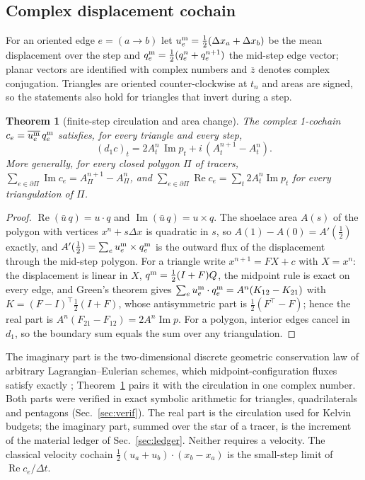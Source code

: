 \documentclass[11pt]{article}
\newtheorem{theorem}{Theorem}\newtheorem{proposition}{Proposition}\newtheorem{corollary}{Corollary}
\theoremstyle{definition}\newtheorem{definition}{Definition}\theoremstyle{remark}\newtheorem{remark}{Remark}
\newcommand{\im}{\operatorname{Im}}\newcommand{\re}{\operatorname{Re}}
\begin{document}
\subsection{Complex displacement cochain}
For an oriented edge $e=(a\to b)$ let $u^{\rm m}_e=\frac12(\Delta x_a+\Delta x_b)$ be the mean displacement over the step and $q^{\rm m}_e=\frac12(q_e^n+q_e^{n+1})$ the mid-step edge vector; planar vectors are identified with complex numbers and $\overline{z}$ denotes complex conjugation. Triangles are oriented counter-clockwise at $t_n$ and areas are signed, so the statements also hold for triangles that invert during a step.
\begin{theorem}[finite-step circulation and area change]\label{thm:cplx}
The complex 1-cochain $c_e=\overline{u^{\rm m}_e}\,q^{\rm m}_e$ satisfies, for every triangle and every step,
\begin{equation}
(d_1c)_t=2A_t^n\,\im p_t+i\,(A_t^{n+1}-A_t^n).
\end{equation}
More generally, for every closed polygon $\Pi$ of tracers, $\sum_{e\in\partial\Pi}\im c_e=A_\Pi^{n+1}-A_\Pi^n$, and $\sum_{e\in\partial\Pi}\re c_e=\sum_t2A_t^n\im p_t$ for every triangulation of $\Pi$.
\end{theorem}
\begin{proof}
$\re(\bar u\,q)=u\cdot q$ and $\im(\bar u\,q)=u\times q$. The shoelace area $A(s)$ of the polygon with vertices $x^n+s\Delta x$ is quadratic in $s$, so $A(1)-A(0)=A'(\frac12)$ exactly, and $A'(\frac12)=\sum_eu^{\rm m}_e\times q^{\rm m}_e$ is the outward flux of the displacement through the mid-step polygon. For a triangle write $x^{n+1}=FX+c$ with $X=x^n$: the displacement is linear in $X$, $q^{\rm m}=\frac12(I+F)Q$, the midpoint rule is exact on every edge, and Green's theorem gives $\sum_eu^{\rm m}_e\cdot q^{\rm m}_e=A^n(K_{12}-K_{21})$ with $K=(F-I)^\top\frac12(I+F)$, whose antisymmetric part is $\frac12(F^\top-F)$; hence the real part is $A^n(F_{21}-F_{12})=2A^n\im p$. For a polygon, interior edges cancel in $d_1$, so the boundary sum equals the sum over any triangulation.
\end{proof}
The imaginary part is the two-dimensional discrete geometric conservation law of arbitrary Lagrangian--Eulerian schemes, which midpoint-configuration fluxes satisfy exactly \citep{ThomasLombard1979,Farhat2001}; Theorem~\ref{thm:cplx} pairs it with the circulation in one complex number. Both parts were verified in exact symbolic arithmetic for triangles, quadrilaterals and pentagons (Sec.~\ref{sec:verif}).
The real part is the circulation used for Kelvin budgets; the imaginary part, summed over the star of a tracer, is the increment of the material ledger of Sec.~\ref{sec:ledger}. Neither requires a velocity. The classical velocity cochain $\frac12(u_a+u_b)\cdot(x_b-x_a)$ is the small-step limit of $\re c_e/\Delta t$.
\end{document}
